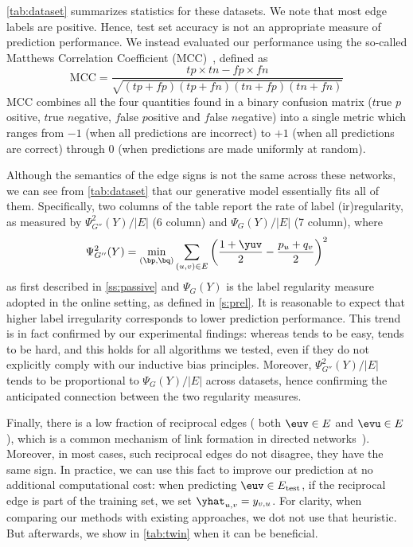 \autoref{tab:dataset} summarizes statistics for these datasets. We note that most edge labels are
positive. Hence, test set accuracy is not an appropriate measure of prediction performance. We
instead evaluated our performance using the so-called Matthews Correlation Coefficient
(MCC)~\autocite{MCC00}, defined as
\begin{equation}
  \label{eq:troll_mcc}
	\mathrm{MCC} = \frac{tp\times tn-fp\times fn}%
        {\sqrt{ (tp + fp) ( tp + fn ) ( tn + fp ) ( tn + fn ) } }%
\end{equation}
MCC combines all the four quantities found in a binary confusion matrix ($t$rue $p$ositive, $t$rue
$n$egative, $f$alse $p$ositive and $f$alse $n$egative) into a single metric which ranges from $-1$
(when all predictions are incorrect) to $+1$ (when all predictions are correct) through $0$ (when
predictions are made uniformly at random).

Although the semantics of the edge signs is not the same across these networks, we can see from
\autoref{tab:dataset} that our generative model essentially fits all of them. Specifically,
two columns of the table report the rate of label (ir)regularity, as measured by
$\Psi^2_{G''}(Y)/|E|$ (6\thup{} column) and $\Psi_{G}(Y)/|E|$ (7\thup{} column), where 
\[
  \Psi^2_{G''}(Y) = \min_{(\bp,\bq)} \sum_{(u,v) \in E}
  \left(\frac{1+\yuv}{2} - \frac{p_u+q_v}{2} \right)^2
\]
as first described in \autoref{ss:passive}
and $\Psi_{G}(Y)$ is the
label regularity measure adopted in the online setting, as defined in \autoref{s:prel}. It is
reasonable to expect that higher label irregularity corresponds to lower prediction performance.
This trend is in fact confirmed by our experimental findings: whereas \epi{} tends to be easy,
\aut{} tends to be hard, and this holds for all algorithms we tested, even if they do not explicitly
comply with our inductive bias principles. Moreover, $\Psi^2_{G''}(Y)/|E|$ tends to be proportional
to $\Psi_{G}(Y)/|E|$ across datasets, hence confirming the anticipated connection between the two
regularity measures.

Finally, there is a low fraction of reciprocal edges (\ie{} both $\euv \in E$ and $\evu
\in E$), which is a common mechanism of link formation in directed
networks~\autocites{DirectedReciprocity04}{Reciprocity13}). Moreover, in most cases, such reciprocal edges do not disagree,
\ie{} they have the same sign. In practice, we can use this fact to improve our prediction at no
additional computational cost: when predicting $\euv \in E_{\mathrm{test}}$, if the reciprocal edge
\evu{} is part of the training set, we set $\yhat_{u,v} = y_{v,u}$. For clarity, when comparing
our methods with existing approaches, we dot not use that heuristic. But afterwards, we show in
\autoref{tab:twin} when it can be beneficial.

